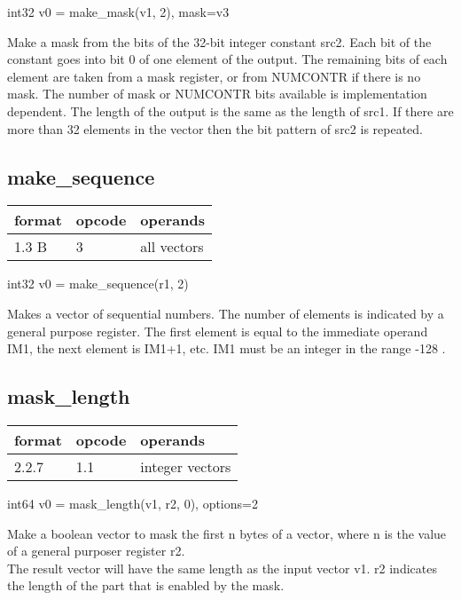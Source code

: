\documentclass[forwardcom.tex]{subfiles}
\begin{document}
int32 v0 = make\_mask(v1, 2), mask=v3
\vv

Make a mask from the bits of the 32-bit integer constant src2. Each bit of the constant goes into bit 0 of one element of the output. The remaining bits of each element are taken from a mask register, or from NUMCONTR if there is no mask. The number of mask or NUMCONTR bits available is implementation dependent. 
The length of the output is the same as the length of src1. If there are more than 32 elements in the vector then the bit pattern of src2 is repeated.
\vv

\subsection{make\_sequence}
\label{table:makeSequenceInstruction}
\begin{tabular}{|p{12mm}|p{15mm}|p{100mm}|}
\hline
\bfseries format & \bfseries opcode & \bfseries operands \\ \hline
1.3 B &  3 & all vectors \\ \hline
\end{tabular}
\vv

int32 v0 = make\_sequence(r1, 2)
\vv

Makes a vector of sequential numbers. The number of elements is indicated by a general purpose register. 
The first element is equal to the immediate operand IM1, the next element is IM1+1, etc. IM1 must be an integer in the range -128 .
\vv


\subsection{mask\_length}
\label{table:maskLengthInstruction}
\begin{tabular}{|p{12mm}|p{15mm}|p{100mm}|}
\hline
\bfseries format & \bfseries opcode & \bfseries operands \\ \hline
2.2.7 & 1.1 & integer vectors \\ \hline
\end{tabular}
\vv

int64 v0 = mask\_length(v1, r2, 0), options=2
\vv

Make a boolean vector to mask the first n bytes of a vector, where n is the value of a general purposer register r2. \\
The result vector will have the same length as the input vector v1. r2 indicates the length of the part that is enabled by the mask. 
\vv
\end{document}
